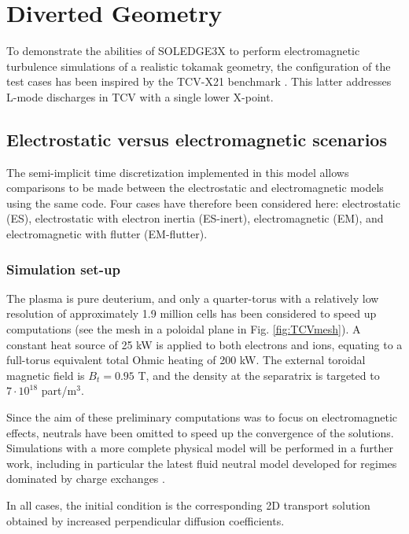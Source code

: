\chapter{Diverted Geometry}
\label{chap:TCV}

To demonstrate the abilities of SOLEDGE3X to perform electromagnetic turbulence simulations of a realistic tokamak geometry, the configuration of the test cases has been inspired by the TCV-X21 benchmark \cite{oliveira2022}. This latter addresses L-mode discharges in TCV with a single lower X-point. 


\section{Electrostatic versus electromagnetic scenarios}

The semi-implicit time discretization implemented in this model allows comparisons to be made between the electrostatic and electromagnetic models using the same code. Four cases have therefore been considered here: electrostatic (ES), electrostatic with electron inertia (ES-inert), electromagnetic (EM), and electromagnetic with flutter (EM-flutter).

\subsection{Simulation set-up}

The plasma is pure deuterium, and only a quarter-torus with a relatively low resolution of approximately 1.9 million cells has been considered to speed up computations (see the mesh in a poloidal plane in Fig. \ref{fig:TCVmesh}). A constant heat source of 25 kW is applied to both electrons and ions, equating to a full-torus equivalent total Ohmic heating of 200 kW. The external toroidal magnetic field is $B_t = 0.95$ T, and the density at the separatrix is targeted to $7 \cdot 10^{18}$ part/m$^3$. \newline

Since the aim of these preliminary computations was to focus on electromagnetic effects, neutrals have been omitted to speed up the convergence of the solutions. Simulations with a more complete physical model will be performed in a further work, including in particular the latest fluid neutral model \cite{quadri2024} developed for regimes dominated by charge exchanges \cite{horsten2017}. \newline

In all cases, the initial condition is the corresponding 2D transport solution obtained by increased perpendicular diffusion coefficients. \newline

